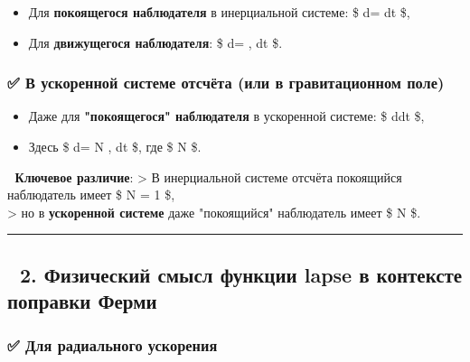 \documentclass[11pt]{article}
\providecommand{\tightlist}{%
      \setlength{\itemsep}{0pt}\setlength{\parskip}{0pt}}
\begin{document}
\begin{itemize}
\tightlist
\item
  Для \textbf{покоящегося наблюдателя} в инерциальной системе: \$
  d\tau = dt \$,
\item
  Для \textbf{движущегося наблюдателя}: \$ d\tau =  ,
  dt \$.
\end{itemize}

\subsubsection{✅ В ускоренной системе отсчёта (или в гравитационном
поле)}\label{ux432-ux443ux441ux43aux43eux440ux435ux43dux43dux43eux439-ux441ux438ux441ux442ux435ux43cux435-ux43eux442ux441ux447ux451ux442ux430-ux438ux43bux438-ux432-ux433ux440ux430ux432ux438ux442ux430ux446ux438ux43eux43dux43dux43eux43c-ux43fux43eux43bux435}

\begin{itemize}
\tightlist
\item
  Даже для \textbf{"покоящегося" наблюдателя} в ускоренной системе: \$
  d\tau \neq dt \$,
\item
  Здесь \$ d\tau = N , dt \$, где \$ N  \$.
\end{itemize}

📌 \textbf{Ключевое различие}: \textgreater{} В инерциальной системе
отсчёта покоящийся наблюдатель имеет \$ N = 1 \$,\\
\textgreater{} но в \textbf{ускоренной системе} даже "покоящийся"
наблюдатель имеет \$ N  \$.

\begin{center}\rule{0.5\linewidth}{\linethickness}\end{center}

\subsection{🔹 2. Физический смысл функции lapse в контексте поправки
Ферми}\label{ux444ux438ux437ux438ux447ux435ux441ux43aux438ux439-ux441ux43cux44bux441ux43b-ux444ux443ux43dux43aux446ux438ux438-lapse-ux432-ux43aux43eux43dux442ux435ux43aux441ux442ux435-ux43fux43eux43fux440ux430ux432ux43aux438-ux444ux435ux440ux43cux438}

\subsubsection{✅ Для радиального
ускорения}\label{ux434ux43bux44f-ux440ux430ux434ux438ux430ux43bux44cux43dux43eux433ux43e-ux443ux441ux43aux43eux440ux435ux43dux438ux44f-1}
\end{document}
